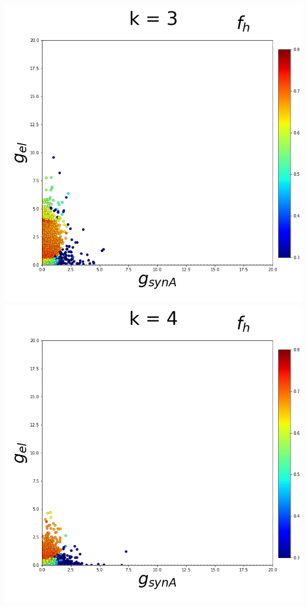 \documentclass[11pt]{article}
\begin{document}
\begin{center}
\includegraphics[scale=0.125]{DSN_figs/STGCircuit_DSN_c=2_rs=1_k=3.png}
\includegraphics[scale=0.125]{DSN_figs/STGCircuit_DSN_c=2_rs=1_k=4.png}

\end{center}
\end{document}
